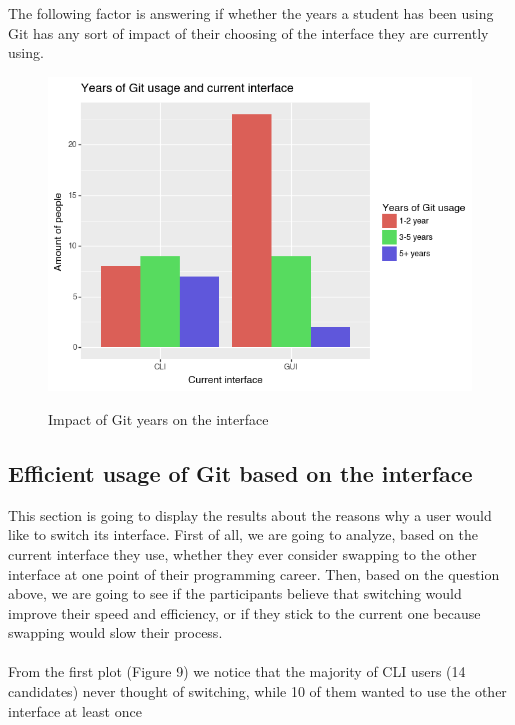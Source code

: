 \documentclass[]{report}
\begin{document}
		The following factor is answering if whether the years a student has been using Git has any sort of impact of their choosing of the interface they are currently using.
		\begin{figure}[H]
			\centering
			\includegraphics[width=0.75\linewidth]{YearsGitImpact}\\
			\caption{Impact of Git years on the interface}
			\label{fig: 8}
		\end{figure}

		\subsection{Efficient usage of Git based on the interface}
		
		This section is going to display the  results about the reasons why a user would like to switch its interface. First of all, we are going to analyze, based on the current interface they use, whether they ever consider swapping to the other interface at one point of their programming career.
		Then, based on the question above, we are going to see if the participants believe that switching would improve their speed and efficiency, or if they stick to the current one because swapping would slow their process.\\\\
		
		From the first plot (Figure 9) we notice that the majority of CLI users (14 candidates) never thought of switching, while 10 of them wanted to use the other interface at least once
		
\end{document}
